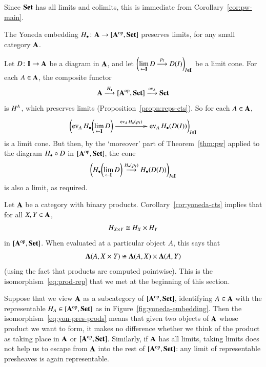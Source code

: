 \begin{pf}
Since $\mathbf{Set}$ has all limits and colimits, this is immediate from
Corollary~\ref{cor:pw-main}.
\end{pf}

\begin{cor}
\label{cor:yoneda-cts}
%
%
%
The Yoneda embedding $\h_\bl\from \scat{A} \to \pshf{\scat{A}}$ preserves
limits, for any small category $\mathbf{A}$.
\end{cor}

\begin{pf}
Let $D\from \scat{I} \to \scat{A}$ be a diagram in $\mathbf{A}$, and let
$\biggl( \lim\limits_{\leftarrow \mathbf{I}} D \stackrel{p_I}{\longrightarrow} D(I) \biggr)_{I \in \mathbf{I}}$ be a
limit cone.  For each $A \in \mathbf{A}$, the composite functor
\[
\mathbf{A} \stackrel{H_\bullet}{\longrightarrow} [\mathbf{A}^{\mathrm{op}},\mathbf{Set}] \stackrel{\operatorname{ev}_A}{\longrightarrow} \mathbf{Set}
\]
is $H^A$, which preserves limits (Proposition~\ref{propn:reps-cts}).  So for
each $A \in \mathbf{A}$,
\[
\biggl(
\ev_A \h_\bl \biggl( \lt{\scat{I}} D \biggr) \,
\xymatrix@1@C+2em{\mbox{} \ar[r]^{\ev_A \h_\bl (p_I)}&\mbox{}}
\ev_A \h_\bl (D(I))
\biggr)_{I \in \scat{I}}
\]
is a limit cone.  But then, by the `moreover' part of Theorem~\ref{thm:pw}
applied to the diagram $H_\bullet \mathbin{\circ} D$ in $[\mathbf{A}^{\mathrm{op}},\mathbf{Set}]$, the cone
\[
\biggl(
H_\bullet \biggl(\lim\limits_{\leftarrow \mathbf{I}} D\biggr)
\stackrel{H_\bullet (p_I)}{\longrightarrow}
H_\bullet (D(I))
\biggr)_{I \in \mathbf{I}}
\]
is also a limit, as required.
\end{pf}

\begin{example}
Let $\mathbf{A}$ be a category with binary products.
Corollary~\ref{cor:yoneda-cts} implies that for all $X, Y \in \mathbf{A}$,
%
\begin{equation}
\label{eq:yon-pres-prods}
H_{X \times Y} \cong H_X \times H_Y
\end{equation}
%
in $[\mathbf{A}^{\mathrm{op}},\mathbf{Set}]$.  When evaluated at a particular object
$A$, this says that
\[
\scat{A}(A, X \times Y) \iso \scat{A}(A, X) \times \scat{A}(A, Y)
%
\index{product!map into}
%
\]
(using the fact that products are computed pointwise).  This is the
isomorphism~\eqref{eq:prod-rep} that we met at the beginning of this
section.

Suppose that we view $\mathbf{A}$ as a subcategory of $[\mathbf{A}^{\mathrm{op}},\mathbf{Set}]$,
identifying $A \in \mathbf{A}$ with the representable $H_A \in
[\mathbf{A}^{\mathrm{op}},\mathbf{Set}]$ as in Figure~\ref{fig:yoneda-embedding}.  Then the
isomorphism~\eqref{eq:yon-pres-prods} means that given two objects of
$\mathbf{A}$ whose product we want to form, it makes no difference whether we
think of the product as taking place in $\mathbf{A}$ or $[\mathbf{A}^{\mathrm{op}},\mathbf{Set}]$.
Similarly, if $\mathbf{A}$ has all limits, taking limits does not help us to
escape from $\mathbf{A}$ into the rest of $[\mathbf{A}^{\mathrm{op}},\mathbf{Set}]$: any limit of
representable presheaves is again representable.%
%
%
\end{example}

